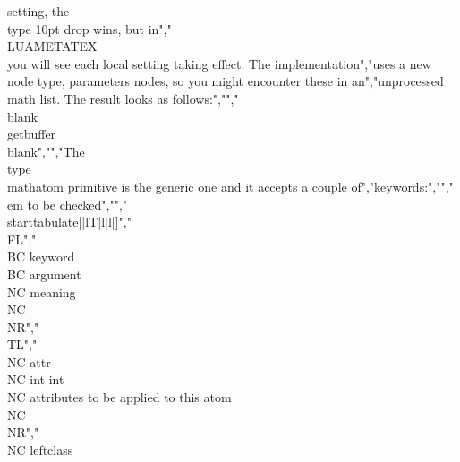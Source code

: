  setting, the \\type {10pt} drop wins, but in","\\LUAMETATEX\\ you will see each local setting taking effect. The implementation","uses a new node type, parameters nodes, so you might encounter these in an","unprocessed math list. The result looks as follows:","","\\blank \\getbuffer \\blank","","The \\type {\\mathatom} primitive is the generic one and it accepts a couple of","keywords:","","{\\em to be checked}","","\\starttabulate[|lT|l|l|]","\\FL","\\BC keyword    \\BC argument \\NC meaning \\NC \\NR","\\TL","\\NC attr       \\NC int int \\NC attributes to be applied to this atom \\NC \\NR","\\NC leftclass